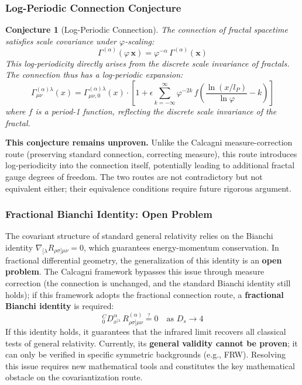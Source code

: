 \documentclass[12pt,a4paper,twocolumn]{article}
\renewcommand{\phi}{\varphi}
\newtheorem{conjecture}[theorem]{Conjecture}
\begin{document}
\subsubsection{Log-Periodic Connection Conjecture}

\begin{conjecture}[Log-Periodic Connection]
The connection of fractal spacetime satisfies scale covariance under $\phi$-scaling:
\begin{equation}
\Gamma^{(\alpha)}(\phi\,\mathbf{x}) = \phi^{-\alpha}\,\Gamma^{(\alpha)}(\mathbf{x})
\label{eq:log_periodic_connection}
\end{equation}
This log-periodicity directly arises from the discrete scale invariance of fractals. The connection thus has a log-periodic expansion:
\[
\Gamma^{(\alpha)\lambda}_{\mu\nu}(x) = \Gamma^{(\alpha)\lambda}_{\mu\nu,0}(x)\cdot\left[1 + \epsilon\sum_{k=-\infty}^{\infty}\phi^{-2k}\,f\!\left(\frac{\ln(x/l_P)}{\ln\phi} - k\right)\right]
\]
where $f$ is a period-1 function, reflecting the discrete scale invariance of the fractal.
\end{conjecture}

\textbf{This conjecture remains unproven.} Unlike the Calcagni measure-correction route (preserving standard connection, correcting measure), this route introduces log-periodicity into the connection itself, potentially leading to additional fractal gauge degrees of freedom. The two routes are not contradictory but not equivalent either; their equivalence conditions require future rigorous argument.

\subsubsection{Fractional Bianchi Identity: Open Problem}

The covariant structure of standard general relativity relies on the Bianchi identity $\nabla_{[\lambda}R_{\rho\sigma]\mu\nu} = 0$, which guarantees energy-momentum conservation. In fractional differential geometry, the generalization of this identity is an \textbf{open problem}. The Calcagni framework bypasses this issue through measure correction (the connection is unchanged, and the standard Bianchi identity still holds); if this framework adopts the fractional connection route, a \textbf{fractional Bianchi identity} is required:
\[
{}^C_0D_{x^{[\lambda}}^\alpha\,R^{(\alpha)}_{\rho\sigma]\mu\nu} \stackrel{?}{=} 0 \quad \text{as } D_s \to 4
\]
If this identity holds, it guarantees that the infrared limit recovers all classical tests of general relativity. Currently, its \textbf{general validity cannot be proven}; it can only be verified in specific symmetric backgrounds (e.g., FRW). Resolving this issue requires new mathematical tools and constitutes the key mathematical obstacle on the covariantization route.
\end{document}
